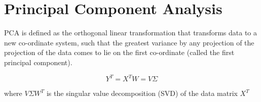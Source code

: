 \section{Principal Component Analysis}
PCA is defined as the orthogonal linear transformation that transforms data to a new co-ordinate system, such that the greatest variance by any projection
of the projection of the data comes to lie on the first co-ordinate (called the first principal component).

\[ Y^{T} = X^{T}W = V \Sigma \]

where $V \Sigma W^{T}$ is the singular value decomposition (SVD) of the data matrix $X^{T}$

